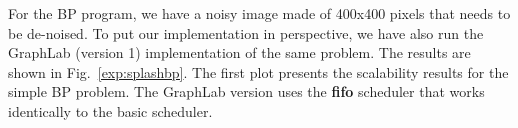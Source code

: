 \begin{table}[ht]

\begin{center}
\end{center}
     \caption{Summarized information about the datasets used in the SSSP program.}
     \label{tbl:shortest_path_speedup}
\end{table}

For the BP program, we have a noisy image made of 400x400 pixels that needs to be de-noised.
To put our implementation in perspective, we have also run the GraphLab (version 1) implementation of the same problem. The results are shown
in Fig.~\ref{exp:splashbp}. The first plot presents the scalability results for the simple BP problem. The GraphLab version
uses the \textbf{fifo} scheduler that works identically to the basic \lang scheduler.

